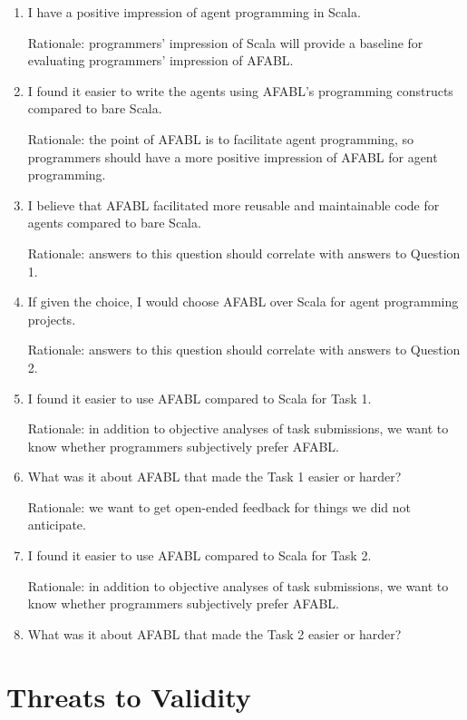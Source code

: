 \begin{enumerate}
\item I have a positive impression of agent programming in Scala.

Rationale: programmers’ impression of Scala will provide a baseline for evaluating
programmers’ impression of AFABL.

\item I found it easier to write the agents using AFABL’s programming constructs compared to bare Scala.

Rationale: the point of AFABL is to facilitate agent programming, so programmers should have a more positive impression of AFABL for agent programming.

\item I believe that AFABL facilitated more reusable and maintainable code for agents compared to bare Scala.

Rationale: answers to this question should correlate with answers to Question 1.

\item If given the choice, I would choose AFABL over Scala for agent programming projects.

Rationale: answers to this question should correlate with answers to Question 2.

\item I found it easier to use AFABL compared to Scala for Task 1.

  Rationale: in addition to objective analyses of task submissions, we want to know whether programmers subjectively prefer AFABL.

\item What was it about AFABL that made the Task 1 easier or harder?

Rationale: we want to get open-ended feedback for things we did not anticipate.

\item I found it easier to use AFABL compared to Scala for Task 2.

Rationale: in addition to objective analyses of task submissions, we want to know whether programmers subjectively prefer AFABL.

\item What was it about AFABL that made the Task 2 easier or harder?

\end{enumerate}


\section{Threats to Validity}

